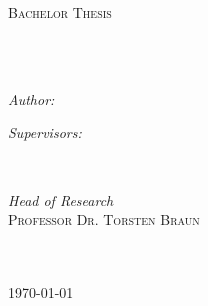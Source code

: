 \documentclass[
11pt, %
english, %
singlespacing, %
headsepline, %
]{MastersDoctoralThesis} %
\author{Mischa \textsc{Wenger}} %
\begin{document}
\frontmatter %

\pagestyle{plain} %


\begin{titlepage}
\begin{center}

\vspace*{.06\textheight}
{\scshape\LARGE \univname\par}\vspace{1.5cm} %
\textsc{\Large Bachelor Thesis}\\[0.5cm] %

\HRule \\[0.4cm] %
{\huge \bfseries \ttitle\par}\vspace{0.4cm} %
\HRule \\[1.5cm] %
 
\begin{minipage}[t]{0.4\textwidth}
\begin{flushleft} \large
\emph{Author:}\\
{\authorname} %
\end{flushleft}
\end{minipage}
\begin{minipage}[t]{0.4\textwidth}
\begin{flushright} \large
\emph{Supervisors:} \\
{\supname} %
\end{flushright}
\end{minipage}\\[3cm]
 
\vfill

\emph{Head of Research}\\[0.3cm] %
\large \textsc{Professor Dr. Torsten Braun}\\[0.4cm]
\groupname\\\deptname\\[2cm] %
 
\vfill

{\large \today}\\[4cm] %
 
\vfill
\end{center}
\end{titlepage}
\end{document}
